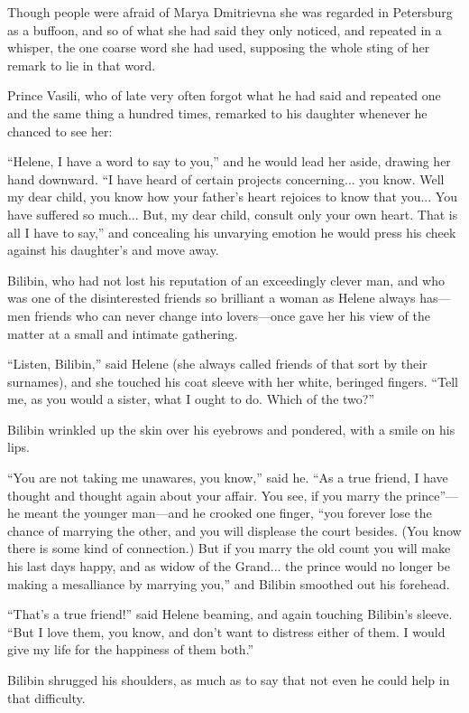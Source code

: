 Though people were afraid of Marya Dmitrievna she was regarded in
Petersburg as a buffoon, and so of what she had said they only
noticed, and repeated in a whisper, the one coarse word she had
used, supposing the whole sting of her remark to lie in that
word.

Prince Vasili, who of late very often forgot what he had said and
repeated one and the same thing a hundred times, remarked to his
daughter whenever he chanced to see her:

``Helene, I have a word to say to you,'' and he would lead her
aside, drawing her hand downward. ``I have heard of certain
projects concerning... you know. Well my dear child, you know how
your father's heart rejoices to know that you... You have
suffered so much... But, my dear child, consult only your own
heart. That is all I have to say,'' and concealing his unvarying
emotion he would press his cheek against his daughter's and move
away.

Bilibin, who had not lost his reputation of an exceedingly clever
man, and who was one of the disinterested friends so brilliant a
woman as Helene always has---men friends who can never change
into lovers---once gave her his view of the matter at a small and
intimate gathering.

``Listen, Bilibin,'' said Helene (she always called friends of
that sort by their surnames), and she touched his coat sleeve
with her white, beringed fingers. ``Tell me, as you would a
sister, what I ought to do.  Which of the two?''

Bilibin wrinkled up the skin over his eyebrows and pondered, with
a smile on his lips.

``You are not taking me unawares, you know,'' said he. ``As a
true friend, I have thought and thought again about your
affair. You see, if you marry the prince''---he meant the younger
man---and he crooked one finger, ``you forever lose the chance of
marrying the other, and you will displease the court
besides. (You know there is some kind of connection.) But if you
marry the old count you will make his last days happy, and as
widow of the Grand... the prince would no longer be making a
mesalliance by marrying you,'' and Bilibin smoothed out his
forehead.

``That's a true friend!'' said Helene beaming, and again touching
Bilibin's sleeve. ``But I love them, you know, and don't want to
distress either of them. I would give my life for the happiness
of them both.''

Bilibin shrugged his shoulders, as much as to say that not even
he could help in that difficulty.


